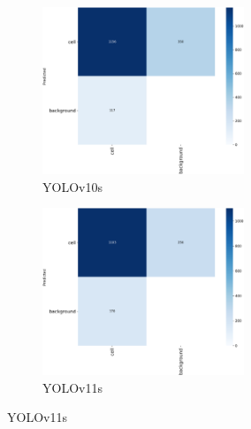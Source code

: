 \documentclass[12pt,a4paper,onecolumn,oneside]{report}
\begin{document}
\begin{figure}[H]
  \vspace{0.1cm}
  \begin{subfigure}[b]{0.45\textwidth}
    \centering
    \includegraphics[height=5cm]{figuras/resultados experimentacion/yolov10s/original_test/confusion_matrix.png}
    \vspace{-0.3cm}
    \caption{\footnotesize YOLOv10s}
    \label{fig:confusion_yolov10s_original_test}
  \end{subfigure}
  \hfill
  \begin{subfigure}[b]{0.45\textwidth}
    \centering
    \includegraphics[height=5cm]{figuras/resultados experimentacion/yolov11s/original_test/confusion_matrix.png}
    \vspace{-0.3cm}
    \caption{\footnotesize YOLOv11s}
    \label{fig:confusion_yolov11s_original_test}
  \end{subfigure}
  

\end{figure}
\end{document}
